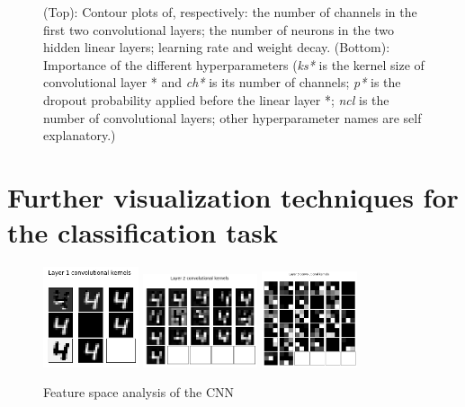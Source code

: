 \documentclass[a4paper, 11pt]{article}
\begin{document}
\begin{appendices}
\begin{figure}[H]
      \caption{(Top): Contour plots of, respectively: the number of channels in the first two convolutional layers; the number of neurons in the two hidden linear layers; learning rate and weight decay. (Bottom): Importance of the different hyperparameters (\emph{ks*} is the kernel size of convolutional layer * and \emph{ch*} is its number of channels; \emph{p*} is the dropout probability applied before the linear layer *; \emph{ncl} is the number of convolutional layers; other hyperparameter names are self explanatory.)}
      \label{fig:c:optuna}
    \end{figure}


  \section{Further visualization techniques for the classification task} \label{app:visualization}
    \begin{figure}[H]
      \centering
      \includegraphics[width=0.25\textwidth]{img/classification/CNN_fs1.png}
      \includegraphics[width=0.3\textwidth]{img/classification/CNN_fs2.png}
      \includegraphics[width=0.25\textwidth]{img/classification/CNN_fs3.png}
      \caption{Feature space analysis of the CNN}
      \label{fig:c:CNN_fs}
    \end{figure}


\end{appendices}
\end{document}
